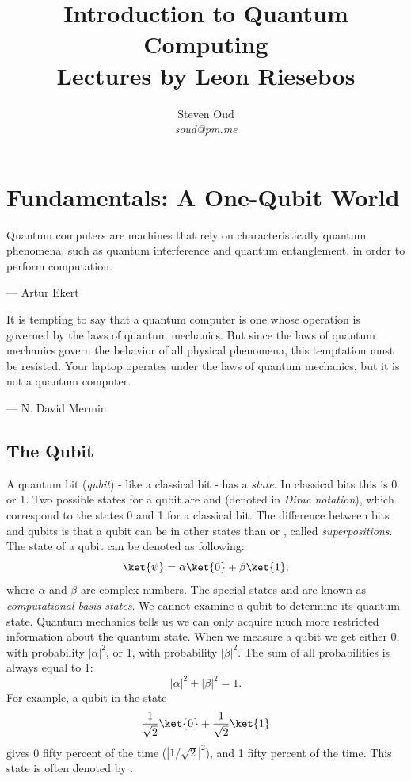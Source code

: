 \documentclass[11pt, notitlepage]{report}
\title{\textbf{Introduction to Quantum Computing \\
\large Lectures by Leon Riesebos}}
\author{Steven Oud \\ \emph{soud@pm.me}}
\makeatletter
\newcommand*{\toccontents}{\@starttoc{toc}}
\makeatother
\begin{document}
     
\maketitle

\toccontents

\newpage

\chapter{Fundamentals: A One-Qubit World}
\epigraph{Quantum computers are machines that rely on characteristically quantum phenomena, such as quantum interference and quantum entanglement, in order to perform computation.}{--- Artur Ekert}

\epigraph{It is tempting to say that a quantum computer is one whose operation is governed by the laws of quantum mechanics. But since the laws of quantum mechanics govern the behavior of all physical phenomena, this temptation must be resisted. Your laptop operates under the laws of quantum mechanics, but it is not a quantum computer.}{--- N. David Mermin}

\section{The Qubit}
A quantum bit (\emph{qubit}) - like a classical bit - has a \emph{state}. In classical bits this is 0 or 1. Two possible states for a qubit are  and  (denoted in \emph{Dirac notation}), which correspond to the states 0 and 1 for a classical bit. The difference between bits and qubits is that a qubit can be in other states than  or , called \emph{superpositions}. The state of a qubit can be denoted as following:
\begin{equation}
  \ket{\psi} = \alpha\ket{0} + \beta\ket{1},
\end{equation}
where $\alpha$ and $\beta$ are complex numbers. The special states  and  are known as \emph{computational basis states}. We cannot examine a qubit to determine its quantum state. Quantum mechanics tells us we can only acquire much more restricted information about the quantum state. When we measure a qubit we get either 0, with probability $|\alpha|^2$, or 1, with probability $|\beta|^2$. The sum of all probabilities is always equal to 1:
\begin{equation}
  |\alpha|^2 + |\beta|^2 = 1.
\end{equation}
For example, a qubit in the state
\begin{equation}
  \dfrac{1}{\sqrt2}\ket{0}+\dfrac{1}{\sqrt2}\ket{1}
\end{equation}
gives 0 fifty percent of the time ($|1/\sqrt2|^2$), and 1 fifty percent of the time. This state is often denoted by \ket{+}.
\end{document}
